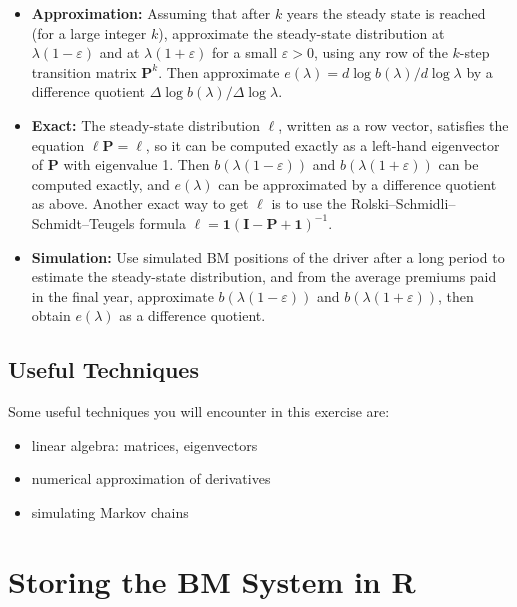 \documentclass{article}
\begin{document}
\begin{itemize}
    \item \textbf{Approximation:} Assuming that after $k$ years the steady state is reached (for a large integer $k$), approximate the steady-state distribution at $\lambda(1 - \varepsilon)$ and at $\lambda(1 + \varepsilon)$ for a small $\varepsilon > 0$, using any row of the $k$-step transition matrix $\mathbf{P}^k$. Then approximate $e(\lambda) = d \log b(\lambda)/d \log \lambda$ by a difference quotient $\Delta \log b(\lambda)/\Delta \log \lambda$.
    
    \item \textbf{Exact:} The steady-state distribution $\ell$, written as a row vector, satisfies the equation $\ell \mathbf{P} = \ell$, so it can be computed exactly as a left-hand eigenvector of $\mathbf{P}$ with eigenvalue 1. Then $b(\lambda(1-\varepsilon))$ and $b(\lambda(1+\varepsilon))$ can be computed exactly, and $e(\lambda)$ can be approximated by a difference quotient as above. Another exact way to get $\ell$ is to use the Rolski--Schmidli--Schmidt--Teugels formula $\ell = \mathbf{1}(\mathbf{I} - \mathbf{P} + \mathbf{1})^{-1}$.
    
    \item \textbf{Simulation:} Use simulated BM positions of the driver after a long period to estimate the steady-state distribution, and from the average premiums paid in the final year, approximate $b(\lambda(1 - \varepsilon))$ and $b(\lambda(1 + \varepsilon))$, then obtain $e(\lambda)$ as a difference quotient.
\end{itemize}
 
\subsection*{Useful Techniques}
 
Some useful techniques you will encounter in this exercise are:
 
\begin{itemize}
    \item linear algebra: matrices, eigenvectors
    \item numerical approximation of derivatives
    \item simulating Markov chains
\end{itemize}
 
\newpage
 
\section{Storing the BM System in R}
 
\end{document}
